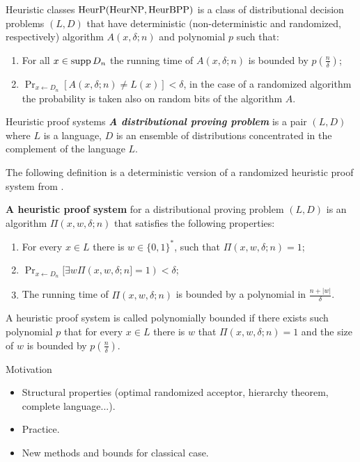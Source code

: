 \begin{frame}{}
\begin{columns}[t]
\begin{column}{0.32\linewidth}
        \begin{block}{Heuristic classes}
	        $\rm HeurP (HeurNP, HeurBPP)$ is a class of distributional decision
            problems $(L,D)$ that have deterministic (non-deterministic and
            randomized, respectively) algorithm $A(x, \delta; n)$ and polynomial
            $p$ such that:
			\begin{enumerate}
				\item For all $x \in \operatorname*{supp} D_n$ the running time of $A(x, \delta; n)$
		            is bounded by  $p(\frac{n}{\delta})$; 
				\item $\Pr_{x \gets D_n} [A(x, \delta; n) \neq L(x)] < \delta$, in
		            the case of a randomized algorithm the probability is taken also
                    on random bits of the algorithm $A$.
			\end{enumerate}            
        \end{block}

        \begin{block}{Heuristic proof systems}
            {\bf \em A distributional proving problem} is a pair $(L,D)$ where $L$ is a
			language, $D$ is an ensemble of distributions concentrated in the
            complement of the language $L$.

			The following definition is a deterministic version of a randomized
            heuristic proof system from \cite{HIMS12}.

            {\bf A heuristic proof system} for a distributional proving problem
            $(L, D)$ is an algorithm $\Pi(x, w, \delta; n)$ that satisfies the
            following properties: 
			\begin{enumerate}
				\item For every $x \in L$ there is $w \in \{0, 1\}^*$, such that
		            $\Pi(x, w, \delta; n)=1$;
				\item $\Pr_{x\gets D_n}[\exists w \Pi(x, w, \delta; n] = 1) <
		            \delta$;
				\item The running time of $\Pi(x, w, \delta; n)$ is bounded by a
		            polynomial in $\frac{n + |w|}{\delta}$. 
			\end{enumerate}
			A heuristic proof system is called polynomially bounded if there exists
            such polynomial $p$ that for every $x\in L$ there is $w$ that 
			$\Pi(x, w, \delta; n) = 1$ and the size of $w$ is bounded by
            $p(\frac{n}{\delta})$.
        \end{block}

        \begin{block}{Motivation}
			\begin{itemize}
			    \item Structural properties (optimal randomized acceptor, hierarchy
		            theorem, complete language...). 
		    	\item Practice.
		        \item New methods and bounds for classical case.
		    \end{itemize}


\end{block}
\end{column}
\end{columns}
\end{frame}
